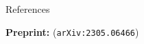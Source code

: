 

\begin{frame}{References}

\textbf{Preprint: }\textcite{giordano:2023:bayesij} (\texttt{arXiv:2305.06466})    

\footnotesize


\begingroup
\renewcommand{\section}[2]{}%

\endgroup

\end{frame}




